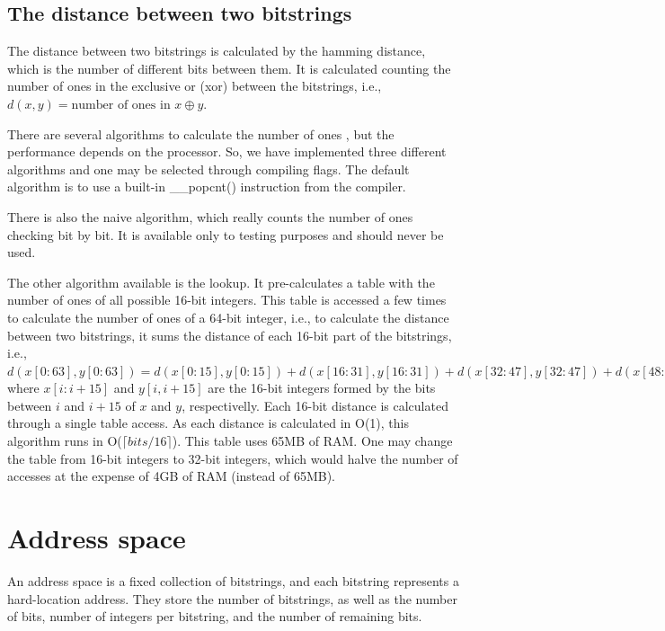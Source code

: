 \subsection{The distance between two bitstrings}

The distance between two bitstrings is calculated by the hamming distance, which is the number of different bits between them. It is calculated counting the number of ones in the exclusive or (xor) between the bitstrings, i.e., $d(x, y) = \text{number of ones in } x \oplus y$.

There are several algorithms to calculate the number of ones \citep{warren2013hacker}, but the performance depends on the processor. So, we have implemented three different algorithms and one may be selected through compiling flags. The default algorithm is to use a built-in \_\_popcnt() instruction from the compiler.

There is also the naive algorithm, which really counts the number of ones checking bit by bit. It is available only to testing purposes and should never be used.

The other algorithm available is the lookup. It pre-calculates a table with the number of ones of all possible 16-bit integers. This table is accessed a few times to calculate the number of ones of a 64-bit integer, i.e., to calculate the distance between two bitstrings, it sums the distance of each 16-bit part of the bitstrings, i.e., $d(x[0:63], y[0:63]) = d(x[0:15], y[0:15]) + d(x[16:31], y[16:31]) + d(x[32:47], y[32:47]) + d(x[48:63], y[48:63])$ where $x[i:i+15]$ and $y[i, i+15]$ are the 16-bit integers formed by the bits between $i$ and $i+15$ of $x$ and $y$, respectivelly. Each 16-bit distance is calculated through a single table access. As each distance is calculated in O(1), this algorithm runs in O($\lceil bits/16 \rceil$). This table uses 65MB of RAM. One may change the table from 16-bit integers to 32-bit integers, which would halve the number of accesses at the expense of 4GB of RAM (instead of 65MB).


\section{Address space}

An address space is a fixed collection of bitstrings, and each bitstring represents a hard-location address. They store the number of bitstrings, as well as the number of bits, number of integers per bitstring, and the number of remaining bits.

